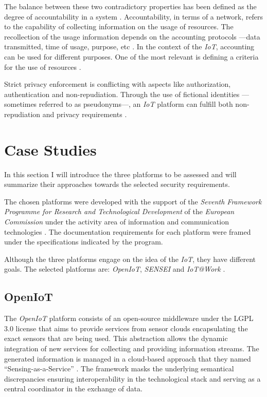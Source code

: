\documentclass[journal]{IEEEtran}
\begin{document}
  The balance between these two contradictory properties has been defined as the degree of accountability in a system \cite{Bassi2013}. Accountability, in terms of a network, refers to the capability of collecting information on the usage of resources. The recollection of the usage information depends on the accounting protocols ---data transmitted, time of usage, purpose, etc  \cite{Sklavos2007}. In the context of the \emph{IoT}, accounting can be used for different purposes. One of the most relevant is defining a criteria for the use of resources \cite{Bauge2010}.

  Strict privacy enforcement is conflicting with aspects like authorization, authentication and non-repudiation. Through the use of fictional identities ---sometimes referred to as pseudonyms---, an \emph{IoT} platform can fulfill both non-repudiation and privacy requirements \cite{Baldini2012}. 
  
\section{Case Studies}
  In this section I will introduce the three platforms to be assessed and will summarize their approaches towards the selected security requirements.

  The chosen platforms were developed with the support of the \emph{Seventh Framework Programme for Research and Technological Development} of the \emph{European Commission} under the activity area of information and communication technologies \cite{FP7}\cite{FP7-ICT}\cite{ICT}. The documentation requirements for each platform were framed under the specifications indicated by the program.

  Although the three platforms engage on the idea of the \emph{IoT}, they have different goals. The selected platforms are: \emph{OpenIoT}, \emph{SENSEI}  and \emph{IoT@Work} \cite{OpenIoT} \cite{SENSEI} \cite{IoTWork}.

  \subsection{OpenIoT}

  The \emph{OpenIoT} platform \cite{OpenIoTWeb} consists of an open-source middleware under the LGPL 3.0 license that aims to provide services from sensor clouds encapsulating the exact sensors that are being used. This abstraction allows the dynamic integration of new services for collecting and providing information streams. The generated information is managed in a cloud-based approach that they named ``Sensing-as-a-Service'' \cite{Baldini2012}.  The framework masks the underlying semantical discrepancies ensuring interoperability in the technological stack and serving as a central coordinator in the exchange of data.
\end{document}
